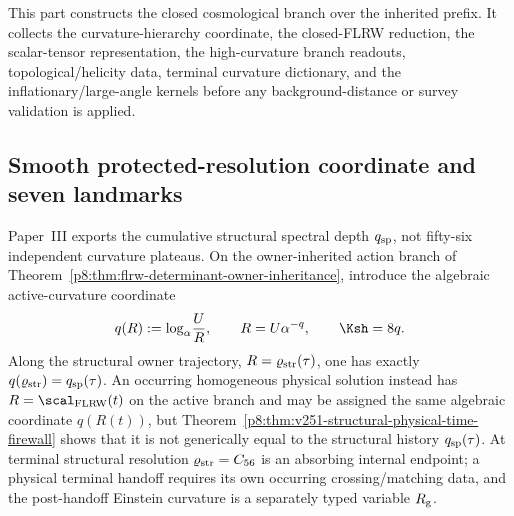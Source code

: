 \documentclass[12pt,a4paper]{article}
\begin{document}
\label{p8:part:core-branch-scalar-tensor}

This part constructs the closed cosmological branch over the inherited prefix.  It collects the curvature-hierarchy coordinate, the closed-FLRW reduction, the scalar-tensor representation, the high-curvature branch readouts, topological/helicity data, terminal curvature dictionary, and the inflationary/large-angle kernels before any background-distance or survey validation is applied.

\subsection{Smooth protected-resolution coordinate and seven landmarks}
\label{p8:subsec:hierarchy-h}

Paper~III exports the cumulative structural spectral depth
\(q_{\rm sp}\), not fifty-six independent curvature plateaus.  On the
owner-inherited action branch of
Theorem~\ref{p8:thm:flrw-determinant-owner-inheritance}, introduce the
algebraic active-curvature coordinate
\begin{equation}
\label{p8:eq:q-resolution-coordinate}
 q(R):=\log_\alpha\!\frac{U}{R},
 \qquad
 R=U\alpha^{-q},
 \qquad
 \Ksh=8q.
\end{equation}
Along the structural owner trajectory,
\(R=\varrho_{\rm str}(\tau)\), one has exactly
\(q(\varrho_{\rm str})=q_{\rm sp}(\tau)\).  An occurring homogeneous
physical solution instead has \(R=\scal_{\rm FLRW}(t)\) on the active
branch and may be assigned the same algebraic coordinate \(q(R(t))\), but
Theorem~\ref{p8:thm:v251-structural-physical-time-firewall} shows that it is
not generically equal to the structural history \(q_{\rm sp}(\tau)\).
At terminal structural resolution \(\varrho_{\rm str}=C_{56}\) is an
absorbing internal endpoint; a physical terminal handoff requires its own
occurring crossing/matching data, and the post-handoff Einstein curvature is a
separately typed variable \(R_{\rm g}\).
\end{document}
